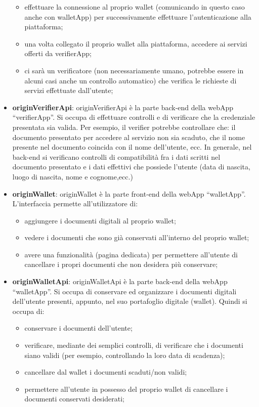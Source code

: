 \begin{itemize}
\begin{itemize}
        \item effettuare la connessione al proprio wallet (comunicando in questo caso anche con walletApp) per successivamente effettuare l’autenticazione alla piattaforma;
        \item una volta collegato il proprio wallet alla piattaforma, accedere ai servizi offerti da verifierApp;
        \item ci sarà un verificatore (non necessariamente umano, potrebbe essere in alcuni casi anche un controllo automatico) che verifica le richieste di servizi effettuate dall’utente;
        \end{itemize}
    \item \textbf{originVerifierApi}: originVerifierApi è la parte back-end della webApp “verifierApp”. Si occupa di effettuare controlli e di verificare che la credenziale presentata sia valida. Per esempio, il verifier potrebbe controllare che: il documento presentato per accedere al servizio non sia scaduto, che il nome presente nel documento coincida con il nome dell’utente, ecc. In generale, nel back-end si verificano controlli di compatibilità fra i dati scritti nel documento presentato e i dati effettivi che possiede l’utente (data di nascita, luogo di nascita, nome e cognome,ecc.)
    \item \textbf{originWallet}: originWallet è la parte front-end della webApp “walletApp”. L’interfaccia permette all’utilizzatore di: \begin{itemize}
        \item aggiungere i documenti digitali al proprio wallet;
        \item vedere i documenti che sono già conservati all’interno del proprio wallet;
        \item avere una funzionalità (pagina dedicata) per permettere all’utente di cancellare i propri documenti che non desidera più conservare;
        \end{itemize}
    \item \textbf{originWalletApi}: originWalletApi è la parte back-end della webApp “walletApp”. Si occupa di conservare ed organizzare i documenti digitali dell’utente presenti, appunto, nel suo portafoglio digitale (wallet). Quindi si occupa di: \begin{itemize}
        \item conservare i documenti dell’utente;
        \item verificare, mediante dei semplici controlli, di verificare che i documenti siano validi (per esempio, controllando la loro data di scadenza);
        \item cancellare dal wallet i documenti scaduti/non validi;
        \item permettere all’utente in possesso del proprio wallet di cancellare i documenti conservati desiderati;
        \end{itemize}
    \end{itemize}

